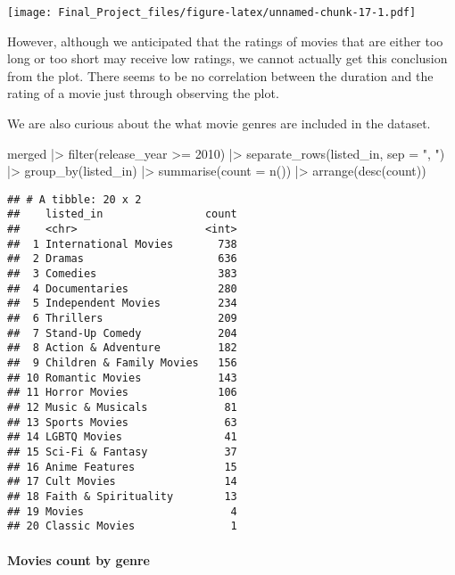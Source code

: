 \documentclass[
]{article}
\newenvironment{Shaded}{\begin{snugshade}}{\end{snugshade}}
\newcommand{\AttributeTok}[1]{\textcolor[rgb]{0.77,0.63,0.00}{#1}}
\newcommand{\DecValTok}[1]{\textcolor[rgb]{0.00,0.00,0.81}{#1}}
\newcommand{\FunctionTok}[1]{\textcolor[rgb]{0.00,0.00,0.00}{#1}}
\newcommand{\NormalTok}[1]{#1}
\newcommand{\SpecialCharTok}[1]{\textcolor[rgb]{0.00,0.00,0.00}{#1}}
\newcommand{\StringTok}[1]{\textcolor[rgb]{0.31,0.60,0.02}{#1}}
\begin{document}
\texttt{[image: Final\_Project\_files/figure-latex/unnamed-chunk-17-1.pdf]}

However, although we anticipated that the ratings of movies that are
either too long or too short may receive low ratings, we cannot actually
get this conclusion from the plot. There seems to be no correlation
between the duration and the rating of a movie just through observing
the plot.

We are also curious about the what movie genres are included in the
dataset.

\begin{Shaded}
\begin{Highlighting}[]
\NormalTok{merged }\SpecialCharTok{|\textgreater{}}
  \FunctionTok{filter}\NormalTok{(release\_year }\SpecialCharTok{\textgreater{}=} \DecValTok{2010}\NormalTok{) }\SpecialCharTok{|\textgreater{}}
  \FunctionTok{separate\_rows}\NormalTok{(listed\_in, }\AttributeTok{sep =} \StringTok{", "}\NormalTok{) }\SpecialCharTok{|\textgreater{}} 
  \FunctionTok{group\_by}\NormalTok{(listed\_in) }\SpecialCharTok{|\textgreater{}} 
  \FunctionTok{summarise}\NormalTok{(}\AttributeTok{count =} \FunctionTok{n}\NormalTok{()) }\SpecialCharTok{|\textgreater{}}
  \FunctionTok{arrange}\NormalTok{(}\FunctionTok{desc}\NormalTok{(count))}
\end{Highlighting}
\end{Shaded}

\begin{verbatim}
## # A tibble: 20 x 2
##    listed_in                count
##    <chr>                    <int>
##  1 International Movies       738
##  2 Dramas                     636
##  3 Comedies                   383
##  4 Documentaries              280
##  5 Independent Movies         234
##  6 Thrillers                  209
##  7 Stand-Up Comedy            204
##  8 Action & Adventure         182
##  9 Children & Family Movies   156
## 10 Romantic Movies            143
## 11 Horror Movies              106
## 12 Music & Musicals            81
## 13 Sports Movies               63
## 14 LGBTQ Movies                41
## 15 Sci-Fi & Fantasy            37
## 16 Anime Features              15
## 17 Cult Movies                 14
## 18 Faith & Spirituality        13
## 19 Movies                       4
## 20 Classic Movies               1
\end{verbatim}

\hypertarget{movies-count-by-genre}{%
\paragraph{Movies count by genre}\label{movies-count-by-genre}}
\end{document}
